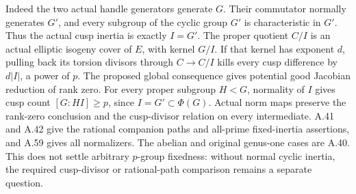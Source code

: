 Indeed the two actual handle generators generate \(G\).
Their commutator normally generates \(G'\), and every
subgroup of the cyclic group \(G'\) is characteristic
in \(G'\). Thus the actual cusp inertia is exactly
\(I=G'\). The proper quotient \(C/I\) is an actual
elliptic isogeny cover of \(E\), with kernel \(G/I\).
If that kernel has exponent \(d\), pulling back its
torsion divisors through \(C\to C/I\) kills every
cusp difference by \(d|I|\), a power of \(p\).
The proposed global consequence gives potential good
Jacobian reduction of rank zero. For every proper
subgroup \(H<G\), normality of \(I\) gives cusp count
\([G:HI]\ge p\), since \(I=G'\subset\Phi(G)\).
Actual norm maps preserve the rank-zero conclusion and
the cusp-divisor relation on every intermediate. A.41
and A.42 give the rational companion paths and all-prime
fixed-inertia assertions, and A.59 gives all normalizers.
The abelian and original genus-one cases are A.40.
This does not settle arbitrary \(p\)-group fixedness:
without normal cyclic inertia, the required cusp-divisor
or rational-path comparison remains a separate question.
